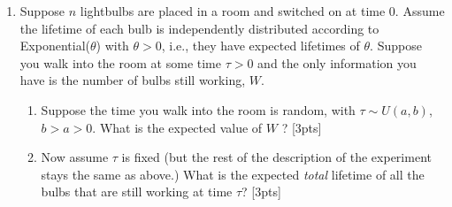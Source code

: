 \documentclass[12pt]{article}
\begin{document}
\begin{enumerate}
\newpage
\item Suppose $n$ lightbulbs are placed in a room and switched on at
  time $0$. Assume the lifetime of each bulb is independently
  distributed according to Exponential($\theta$) with $\theta>0$, i.e., they have
 expected lifetimes of $\theta$. Suppose you walk into the room at some time
  $\tau > 0 $ and the only information you have is the number of bulbs
  still working, $W$.
\begin{enumerate}
\item Suppose the time you walk into the room is random, with $\tau \sim U(a,b)$, $b > a >0$. What is the expected value of $W$ ? [3pts]
\item Now assume $\tau$ is fixed (but the rest of the description of
  the experiment stays the same as above.) What is the expected {\it total}
  lifetime of all the bulbs that are still working at time $\tau$?
  [3pts]
\end{enumerate}

\newpage


\end{enumerate}
\end{document}
